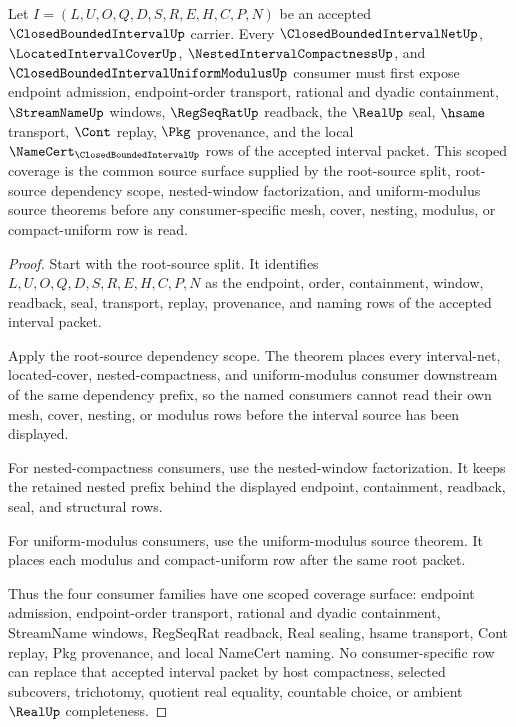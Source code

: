 \begin{theorem}
\label{thm:closed-bounded-interval-root-source-scoped-coverage}
Let $I=(L,U,O,Q,D,S,R,E,H,C,P,N)$ be an accepted $\ClosedBoundedIntervalUp$ carrier. Every $\ClosedBoundedIntervalNetUp$, $\LocatedIntervalCoverUp$, $\NestedIntervalCompactnessUp$, and $\ClosedBoundedIntervalUniformModulusUp$ consumer must first expose endpoint admission, endpoint-order transport, rational and dyadic containment, $\StreamNameUp$ windows, $\RegSeqRatUp$ readback, the $\RealUp$ seal, $\hsame$ transport, $\Cont$ replay, $\Pkg$ provenance, and the local $\NameCert_{\ClosedBoundedIntervalUp}$ rows of the accepted interval packet. This scoped coverage is the common source surface supplied by the root-source split, root-source dependency scope, nested-window factorization, and uniform-modulus source theorems before any consumer-specific mesh, cover, nesting, modulus, or compact-uniform row is read.
\end{theorem}
\begin{proof}
Start with the root-source split. It identifies $L,U,O,Q,D,S,R,E,H,C,P,N$ as the endpoint, order, containment, window, readback, seal, transport, replay, provenance, and naming rows of the accepted interval packet.

Apply the root-source dependency scope. The theorem places every interval-net, located-cover, nested-compactness, and uniform-modulus consumer downstream of the same dependency prefix, so the named consumers cannot read their own mesh, cover, nesting, or modulus rows before the interval source has been displayed.

For nested-compactness consumers, use the nested-window factorization. It keeps the retained nested prefix behind the displayed endpoint, containment, readback, seal, and structural rows.

For uniform-modulus consumers, use the uniform-modulus source theorem. It places each modulus and compact-uniform row after the same root packet.

Thus the four consumer families have one scoped coverage surface: endpoint admission, endpoint-order transport, rational and dyadic containment, StreamName windows, RegSeqRat readback, Real sealing, hsame transport, Cont replay, Pkg provenance, and local NameCert naming. No consumer-specific row can replace that accepted interval packet by host compactness, selected subcovers, trichotomy, quotient real equality, countable choice, or ambient $\RealUp$ completeness.
\end{proof}

